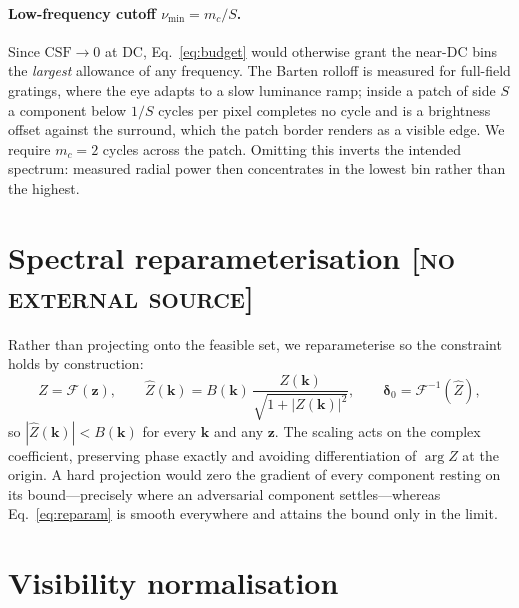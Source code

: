 \documentclass[11pt,a4paper]{article}
\newcommand{\novel}{\hfill{\normalfont\small\textsc{[no external source]}}}
\begin{document}
\paragraph{Low-frequency cutoff $\nu_{\min}=m_c/S$.}
Since $\mathrm{CSF}\to0$ at DC, Eq.~\eqref{eq:budget} would otherwise
grant the near-DC bins the \emph{largest} allowance of any frequency.
The Barten rolloff is measured for full-field gratings, where the eye
adapts to a slow luminance ramp; inside a patch of side $S$ a component
below $1/S$ cycles per pixel completes no cycle and is a brightness
offset against the surround, which the patch border renders as a visible
edge. We require $m_c=2$ cycles across the patch. Omitting this inverts
the intended spectrum: measured radial power then concentrates in the
lowest bin rather than the highest.

\section{Spectral reparameterisation \novel}

Rather than projecting onto the feasible set, we reparameterise so the
constraint holds by construction:
\begin{equation}
  Z=\mathcal{F}(\mathbf{z}),\qquad
  \hat{Z}(\mathbf{k})=B(\mathbf{k})\,
  \frac{Z(\mathbf{k})}{\sqrt{1+|Z(\mathbf{k})|^{2}}},\qquad
  \boldsymbol{\delta}_0=\mathcal{F}^{-1}(\hat{Z}),
  \label{eq:reparam}
\end{equation}
so $|\hat{Z}(\mathbf{k})|<B(\mathbf{k})$ for every $\mathbf{k}$ and any
$\mathbf{z}$. The scaling acts on the complex coefficient, preserving
phase exactly and avoiding differentiation of $\arg Z$ at the origin. A
hard projection would zero the gradient of every component resting on
its bound---precisely where an adversarial component settles---whereas
Eq.~\eqref{eq:reparam} is smooth everywhere and attains the bound only
in the limit.

\section{Visibility normalisation}
\end{document}
